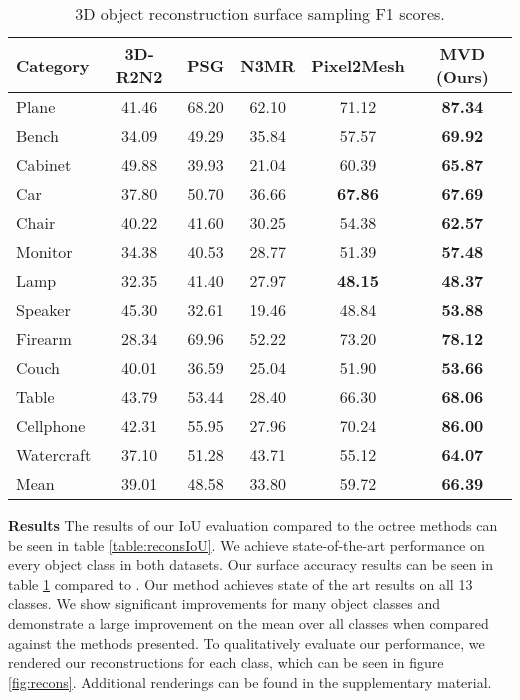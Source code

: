 \documentclass{article}
\begin{document}
\begin{table} 
  \caption{3D object reconstruction surface sampling F1 scores.} \label{table:reconsMesh}
  \centering
  \begin{tabular}{lccccc}
    \toprule
    Category 	& 3D-R2N2 \cite{choy20163d} & PSG \cite{fan2017point} & N3MR \cite{kato2017neural} & Pixel2Mesh \cite{pixel2mesh} & MVD (Ours) \\
    \midrule
    Plane 		& 41.46 & 68.20 & 62.10 & 71.12 & \bf{87.34}\\
    Bench 		& 34.09 & 49.29 & 35.84 & 57.57 &  \bf{69.92}\\
    Cabinet 	& 49.88 & 39.93 & 21.04 & 60.39 & \bf{65.87}\\
   	Car 		& 37.80 & 50.70 & 36.66 & \bf{67.86} & \bf{67.69} \\
    Chair 		& 40.22 & 41.60 & 30.25 & 54.38 & \bf{62.57}\\
   	Monitor 	& 34.38 & 40.53 & 28.77 & 51.39 & \bf{57.48}   \\
    Lamp 		& 32.35 & 41.40 & 27.97 & \bf{48.15} &\bf {48.37}\\
    Speaker 	& 45.30 & 32.61 & 19.46 & 48.84 & \bf{53.88} \\
   	Firearm 	& 28.34 & 69.96 & 52.22 & 73.20 & \bf{78.12}\\
    Couch 		& 40.01 & 36.59 & 25.04 & 51.90 &  \bf{53.66} \\
   	Table 		& 43.79 & 53.44 & 28.40 & 66.30 &  \bf{68.06}\\
    Cellphone 	& 42.31 & 55.95 & 27.96 & 70.24 &  \bf{86.00} \\
   	Watercraft 	& 37.10 & 51.28 & 43.71 & 55.12 &   \bf{64.07} \\
    \midrule
    Mean       & 39.01 & 48.58 & 33.80 & 59.72 &   \bf{66.39} \\
    \bottomrule
  \end{tabular}
\end{table}

\textbf{Results} \quad The results of our IoU evaluation compared to the octree methods \cite{OGN,HSP} can be seen in table \ref{table:reconsIoU}. We achieve state-of-the-art performance on every object class in both datasets. Our surface accuracy results can be seen in table \ref{table:reconsMesh} compared to \cite{pixel2mesh,fan2017point,kato2017neural,choy20163d}. Our method achieves state of the art results on all 13 classes. We show significant improvements for many object classes and demonstrate a large improvement on the mean over all classes when compared against the methods presented. To qualitatively evaluate our performance, we rendered our reconstructions for each class, which can be seen in figure \ref{fig:recons}. Additional renderings can be found in the supplementary material. 
\end{document}
